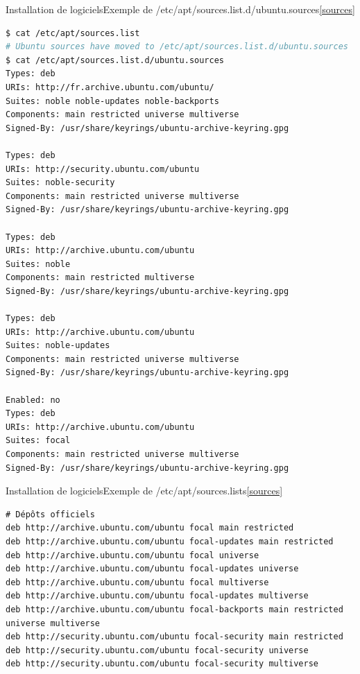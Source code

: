 \documentclass{beamer}
\begin{document}
    \begin{frame}[fragile]{Installation de logiciels}{Exemple de /etc/apt/sources.list.d/ubuntu.sources\cref{sources}}
        \begin{lstlisting}[language=bash,basicstyle=\tiny\ttfamily]
$ cat /etc/apt/sources.list
# Ubuntu sources have moved to /etc/apt/sources.list.d/ubuntu.sources
$ cat /etc/apt/sources.list.d/ubuntu.sources
Types: deb
URIs: http://fr.archive.ubuntu.com/ubuntu/
Suites: noble noble-updates noble-backports
Components: main restricted universe multiverse
Signed-By: /usr/share/keyrings/ubuntu-archive-keyring.gpg

Types: deb
URIs: http://security.ubuntu.com/ubuntu
Suites: noble-security
Components: main restricted universe multiverse
Signed-By: /usr/share/keyrings/ubuntu-archive-keyring.gpg

Types: deb
URIs: http://archive.ubuntu.com/ubuntu
Suites: noble
Components: main restricted multiverse
Signed-By: /usr/share/keyrings/ubuntu-archive-keyring.gpg

Types: deb
URIs: http://archive.ubuntu.com/ubuntu
Suites: noble-updates
Components: main restricted universe multiverse
Signed-By: /usr/share/keyrings/ubuntu-archive-keyring.gpg

Enabled: no
Types: deb
URIs: http://archive.ubuntu.com/ubuntu
Suites: focal
Components: main restricted universe multiverse
Signed-By: /usr/share/keyrings/ubuntu-archive-keyring.gpg
        \end{lstlisting}
    \end{frame}

    \begin{frame}[fragile]{Installation de logiciels}{Exemple de /etc/apt/sources.lists\cref{sources}}
        \begin{lstlisting}
# Dépôts officiels
deb http://archive.ubuntu.com/ubuntu focal main restricted
deb http://archive.ubuntu.com/ubuntu focal-updates main restricted
deb http://archive.ubuntu.com/ubuntu focal universe
deb http://archive.ubuntu.com/ubuntu focal-updates universe
deb http://archive.ubuntu.com/ubuntu focal multiverse
deb http://archive.ubuntu.com/ubuntu focal-updates multiverse
deb http://archive.ubuntu.com/ubuntu focal-backports main restricted universe multiverse
deb http://security.ubuntu.com/ubuntu focal-security main restricted
deb http://security.ubuntu.com/ubuntu focal-security universe
deb http://security.ubuntu.com/ubuntu focal-security multiverse
        \end{lstlisting}
    \end{frame}
\end{document}
